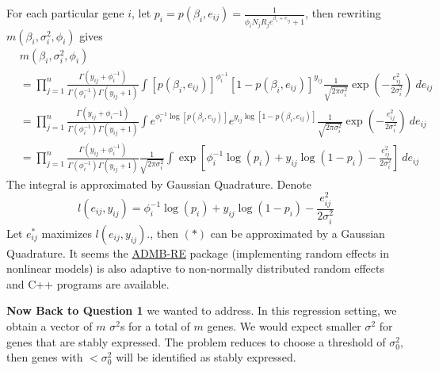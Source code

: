 \documentclass[paper=a4, fontsize=12.5pt]{scrartcl} %
\numberwithin{equation}{section} %
\numberwithin{figure}{section} %
\numberwithin{table}{section} %
\begin{document}
   For each particular gene $i$, let $p_{i} = p(\beta_i, e_{ij}) =\frac{1}{\phi_i N_jR_je^{\beta_i  + e_{ij}} + 1}$, then rewriting $m(\beta_i, \sigma^2_i, \phi_i)$ gives 
\begin{align*}
  & m(\beta_i, \sigma^2_i, \phi_i) \\
   &= \prod_{j=1}^n\frac{\Gamma(y_{ij}+ \phi_i^{-1})}{\Gamma(\phi_i^{-1})\Gamma(y_{ij} + 1)}\int [p(\beta_i, e_{ij})]^{\phi_i^{-1}}[1-p(\beta_i, e_{ij})]^{y_{ij}}\frac{1}{\sqrt{2\pi\sigma^2_i}}\exp\left(-\frac{e_{ij}^2}{2\sigma_i^2}\right)~de_{ij}  \\
   &= \prod_{j=1}^n\frac{\Gamma(y_{ij}+ \phi_i{-1})}{\Gamma(\phi_i^{-1})\Gamma(y_{ij} + 1)}\int e^{\phi_i^{-1}\log[p(\beta_i,e_{ij})]}e^{y_{ij}\log[1-p(\beta_i, e_{ij})]} \frac{1}{\sqrt{2\pi\sigma_i^2}}\exp\left(-\frac{e_{ij}^2}{2\sigma_i^2}\right)~de_{ij} \\ 
   & =\prod_{j=1}^n\frac{\Gamma(y_{ij}+ \phi_i^{-1})}{\Gamma(\phi_i^{-1})\Gamma(y_{ij} + 1)}\frac{1}{\sqrt{2\pi\sigma^2_i}}\int \exp\left[\phi_i^{-1}\log (p_{i}) + y_{ij}\log(1-p_{i}) - \frac{e_{ij}^2}{2\sigma_i^2}\right]~de_{ij}
\end{align*}
   The integral is approximated by Gaussian Quadrature. Denote
    $$l(e_{ij}, y_{ij})=\phi_i^{-1}\log(p_{i}) + y_{ij}\log(1-p_{i})-\frac{e_{ij}^2}{2\sigma_i^2}$$
   Let $e_{ij}^{\ast}$ maximizes $l(e_{ij}, y_{ij})$., then  $(\ast)$ can be approximated by 
   a Gaussian Quadrature.
   It seems the \href{http://www.admb-project.org/documentation/manuals}{ADMB-RE} package (implementing random effects in nonlinear models) is also adaptive to non-normally distributed random effects and C++ programs are available. 
   
   \textbf{Now Back to Question 1} we wanted to address.  In this regression setting, we obtain a vector of $m$ $\sigma^2$s for a total of $m$ genes. We would expect smaller $\sigma^2$ for genes that are stably expressed. The problem reduces to choose a threshold of $\sigma^2_0$, then genes with $<\sigma^2_0$ will be identified as stably expressed. 
\end{document}

